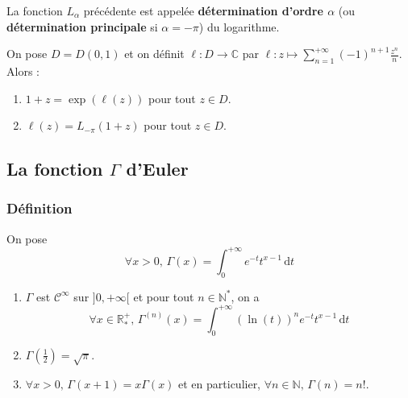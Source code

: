 	\begin{definition}
		La fonction $L_\alpha$ précédente est appelée \textbf{détermination d'ordre $\alpha$} (ou \textbf{détermination principale} si $\alpha = -\pi$) du logarithme.
	\end{definition}
	
	\begin{theorem}
		On pose $D = D(0,1)$ et on définit $\ell : D \rightarrow \mathbb{C}$ par $\ell : z \mapsto \sum_{n=1}^{+\infty} (-1)^{n+1} \frac{z^n}{n}$. Alors :
		\begin{enumerate}[label=(\roman*)]
			\item $1 + z = \exp(\ell(z))$ pour tout $z \in D$.
			\item $\ell(z) = L_{-\pi}(1+z)$ pour tout $z \in D$.
		\end{enumerate}
	\end{theorem}
	
	\subsection{La fonction \texorpdfstring{$\Gamma$}{Gamma} d'Euler}
	
	\subsubsection{Définition}
	
	
	\begin{definition}
		On pose
		\[ \forall x > 0, \, \Gamma(x) = \int_0^{+\infty} e^{-t} t^{x-1} \, \mathrm{d}t \]
	\end{definition}
	
	\begin{proposition}
		\begin{enumerate}[label=(\roman*)]
			\item $\Gamma$ est $\mathcal{C}^\infty$ sur $]0, +\infty[$ et pour tout $n \in \mathbb{N}^*$, on a
			\[ \forall x \in \mathbb{R}_*^+, \, \Gamma^{(n)}(x) = \int_{0}^{+\infty} (\ln(t))^n e^{-t} t^{x-1} \, \mathrm{d}t \]
			\item $\Gamma \left( \frac{1}{2} \right) = \sqrt{\pi}$.
			\item $\forall x > 0, \, \Gamma(x+1) = x \Gamma(x)$ et en particulier, $\forall n \in \mathbb{N}, \, \Gamma(n) = n!$.
		\end{enumerate}
	\end{proposition}
	
	
